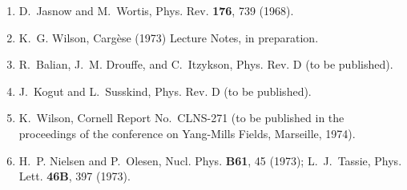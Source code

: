 \begin{center}
\begin{minipage}{0.93\textwidth}
\begin{enumerate}[leftmargin=1.6em,itemsep=1pt,parsep=0pt,topsep=2pt]
\item D.~Jasnow and M.~Wortis, Phys. Rev. \textbf{176}, 739 (1968).
\item K.~G. Wilson, Carg\`ese (1973) Lecture Notes, in preparation.
\item R.~Balian, J.~M. Drouffe, and C.~Itzykson, Phys. Rev. D (to be published).
\item J.~Kogut and L.~Susskind, Phys. Rev. D (to be published).
\item K.~Wilson, Cornell Report No.~CLNS-271 (to be published in the proceedings of the conference on Yang-Mills Fields, Marseille, 1974).
\item H.~P. Nielsen and P.~Olesen, Nucl. Phys. \textbf{B61}, 45 (1973); L.~J.~Tassie, Phys. Lett. \textbf{46B}, 397 (1973).
\end{enumerate}
\end{minipage}
\end{center}
